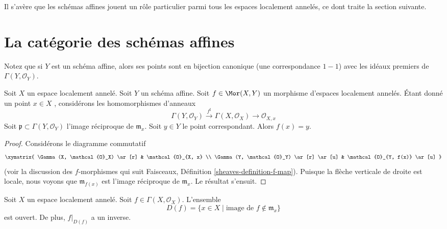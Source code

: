 \noindent
Il s'avère que les schémas affines jouent un rôle particulier parmi tous les
espaces localement annelés, ce dont traite la section suivante.


















\section{La catégorie des schémas affines}
\label{section-category-affine-schemes}

\noindent
Notez que si $Y$ est un schéma affine, alors ses points sont en
bijection canonique (une correspondance  $1-1$) avec les idéaux premiers de $\Gamma(Y, \mathcal{O}_Y)$.

\begin{lemma}
\label{lemma-morphism-into-affine-where-point-goes}
Soit  $X$  un espace localement annelé. Soit  $Y$  un schéma affine.
Soit  $f \in \Mor(X, Y)$  un morphisme d'espaces localement annelés. Étant donné un point
 $x \in X$ , considérons les homomorphismes d'anneaux
$$
\Gamma(Y, \mathcal{O}_Y) \xrightarrow{f^\sharp}
\Gamma(X, \mathcal{O}_X) \to \mathcal{O}_{X, x}
$$
Soit  $\mathfrak p \subset \Gamma(Y, \mathcal{O}_Y)$  l'image réciproque de  $\mathfrak m_x$. Soit  $y \in Y$  le point
correspondant. Alors  $f(x) = y$.
\end{lemma}

\begin{proof}
Considérons le diagramme commutatif
$$
\xymatrix{
\Gamma(X, \mathcal{O}_X) \ar[r] &
\mathcal{O}_{X, x} \\
\Gamma(Y, \mathcal{O}_Y) \ar[r] \ar[u] &
\mathcal{O}_{Y, f(x)} \ar[u]
}
$$
(voir la discussion des  $f$-morphismes qui suit Faisceaux, Définition
 \ref{sheaves-definition-f-map}). Puisque la flèche verticale de droite est locale, nous voyons que
 $\mathfrak m_{f(x)}$  est l'image réciproque de  $\mathfrak m_x$. Le résultat s'ensuit.
\end{proof}

\begin{lemma}
\label{lemma-f-open}
Soit  $X$  un espace localement annelé. Soit  $f \in \Gamma(X, \mathcal{O}_X)$. L'ensemble
$$
D(f) = \{x \in X \mid \text{image de }f \not\in \mathfrak m_x\}
$$
est ouvert. De plus,  $f|_{D(f)}$  a un inverse.
\end{lemma}


